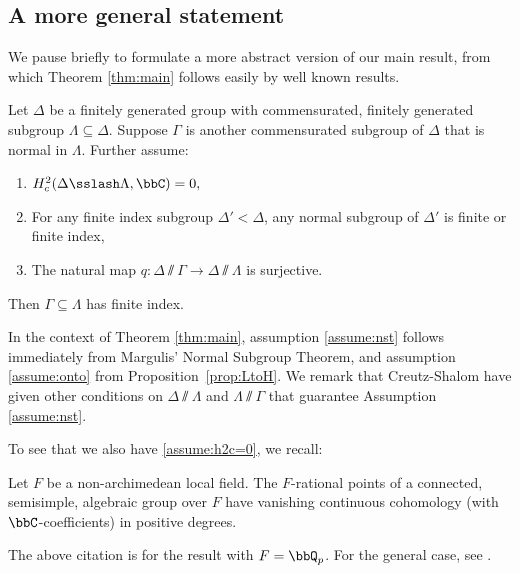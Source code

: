 \subsection{A more general statement}
\label{subsec:generalversion}

We pause briefly to formulate a more abstract version of our main result, from which Theorem \ref{thm:main} follows easily by well known results.

\begin{thm}\label{thm:gen}
Let $\Delta$ be a finitely generated group with commensurated, finitely generated subgroup $\Lambda\subseteq \Delta$. Suppose $\Gamma$ is another commensurated subgroup of $\Delta$ that is normal in $\Lambda$. Further assume:
\begin{enumerate}
\item\label{assume:h2c=0} $H^2_c(\Delta\sslash \Lambda, \bbC)=0,$ 
\item\label{assume:nst} For any finite index subgroup $\Delta'<\Delta$, any normal subgroup of $\Delta'$ is finite or finite index, 
\item\label{assume:onto}
The natural map $q: \Delta\sslash\Gamma \to \Delta\sslash\Lambda$ is surjective.
\end{enumerate}
Then $\Gamma\subseteq\Lambda$ has finite index.
\end{thm}

In the context of Theorem \ref{thm:main}, assumption \eqref{assume:nst} follows immediately from Margulis' Normal Subgroup Theorem, and assumption \eqref{assume:onto} from Proposition~\ref{prop:LtoH}. We remark that Creutz-Shalom \cite{creutz-shalom} have given other conditions on $\Delta\sslash\Lambda$ and $\Lambda\sslash\Gamma$ that guarantee Assumption \eqref{assume:nst}.

To see that we also have \eqref{assume:h2c=0}, we recall:

\begin{thm}
\label{CW}
Let $F$ be a non-archimedean local field. The $F$-rational points of a connected, semisimple, algebraic group over $F$ have vanishing continuous cohomology (with $\bbC$-coefficients) in positive degrees.
\end{thm}

\begin{rem}\label{rem:any-field}
The above citation is for the result with $F=\bbQ_p$. For the general case, see \cite[Rem.\,(2), p.\,210]{casselman-wigner}.
\end{rem}

